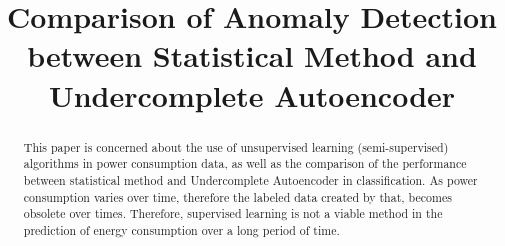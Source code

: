 \documentclass[conference]{IEEEtran}
\begin{document}
\title{Comparison of Anomaly Detection between Statistical Method and Undercomplete Autoencoder\\
}

\author{
\and
{}
\and
{}

\and
\IEEEauthorblockN{}
\IEEEauthorblockA{\textit{ } \\
	\textit{ }\\
	}

\and


}

\maketitle

\begin{abstract}
This paper is concerned about the use of unsupervised learning (semi-supervised) algorithms in power consumption data, as well as the comparison of the performance between statistical method and Undercomplete Autoencoder in classification. As power consumption varies over time, therefore the labeled data created by that, becomes obsolete over times. Therefore, supervised learning is not a viable method in the prediction of energy consumption over a long period of time.

\end{abstract}
\end{document}
